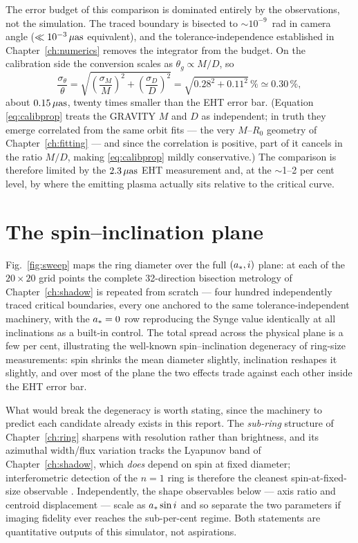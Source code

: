 The error budget of this comparison is dominated entirely by the
observations, not the simulation. The traced boundary is bisected to
$\sim$$10^{-9}$~rad in camera angle ($\ll 10^{-3}\,\mu\mathrm{as}$ equivalent),
and the tolerance-independence established in
Chapter~\ref{ch:numerics} removes the integrator from the budget.
On the calibration side the conversion scales as
$\theta_g \propto M/D$, so
\begin{equation}
\frac{\sigma_{\theta}}{\theta}
= \sqrt{\left(\frac{\sigma_M}{M}\right)^{\!2}
+ \left(\frac{\sigma_D}{D}\right)^{\!2}}
= \sqrt{0.28^2 + 0.11^2}\,\% \simeq 0.30\,\%,
\label{eq:calibprop}
\end{equation}
about $0.15\,\mu\mathrm{as}$, twenty times smaller than the EHT error bar.
(Equation \eqref{eq:calibprop} treats the GRAVITY $M$ and $D$ as
independent; in truth they emerge correlated from the same orbit fits
— the very $M$--$R_0$ geometry of Chapter~\ref{ch:fitting} — and
since the correlation is positive, part of it cancels in the ratio
$M/D$, making \eqref{eq:calibprop} mildly conservative.) The
comparison is therefore limited by the $2.3\,\mu\mathrm{as}$ EHT measurement and,
at the $\sim$1--2 per cent level, by where the emitting plasma actually
sits relative to the critical curve.

\section{The spin--inclination plane}
\label{sec:sweep}

Fig.~\ref{fig:sweep} maps the ring diameter over the
full $(a_*, i)$ plane: at each of the $20\times20$ grid points the
complete 32-direction bisection metrology of
Chapter~\ref{ch:shadow} is repeated from scratch — four hundred
independently traced critical boundaries, every one anchored to the
same tolerance-independent machinery, with the $a_* = 0$ row
reproducing the Synge value identically at all inclinations as a
built-in control. The total spread across the physical plane is a few
per cent, illustrating the well-known spin--inclination degeneracy of
ring-size measurements: spin shrinks the mean diameter slightly,
inclination reshapes it slightly, and over most of the plane the two
effects trade against each other inside the EHT error bar.

What would break the degeneracy is worth stating, since the machinery
to predict each candidate already exists in this report. The
\emph{sub-ring} structure of Chapter~\ref{ch:ring} sharpens with
resolution rather than brightness, and its azimuthal width/flux
variation tracks the Lyapunov band of Chapter~\ref{ch:shadow}, which
\emph{does} depend on spin at fixed diameter; interferometric
detection of the $n = 1$ ring is therefore the cleanest
spin-at-fixed-size observable \citep{Johnson2020}. Independently, the
shape observables below — axis ratio and centroid displacement —
scale as $a_*\sin i$ and so separate the two parameters if imaging
fidelity ever reaches the sub-per-cent regime. Both statements are
quantitative outputs of this simulator, not aspirations.

